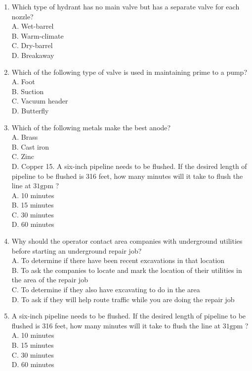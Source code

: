 \documentclass[10pt]{article}
\begin{document}
\begin{enumerate}
  \item Which type of hydrant has no main valve but has a separate valve for each nozzle?\\
A. Wet-barrel\\
B. Warm-climate\\
C. Dry-barrel\\
D. Breakaway

  \item Which of the following type of valve is used in maintaining prime to a pump?\\
A. Foot\\
B. Suction\\
C. Vacuum header\\
D. Butterfly

  \item Which of the following metals make the best anode?\\
A. Brass\\
B. Cast iron\\
C. Zinc\\
D. Copper 15. A six-inch pipeline needs to be flushed. If the desired length of pipeline to be flushed is 316 feet, how many minutes will it take to flush the line at $31 \mathrm{gpm}$ ?\\
A. 10 minutes\\
B. 15 minutes\\
C. 30 minutes\\
D. 60 minutes

  \item Why should the operator contact area companies with underground utilities before starting an underground repair job?\\
A. To determine if there have been recent excavations in that location\\
B. To ask the companies to locate and mark the location of their utilities in the area of the repair job\\
C. To determine if they also have excavating to do in the area\\
D. To ask if they will help route traffic while you are doing the repair job

  \item A six-inch pipeline needs to be flushed. If the desired length of pipeline to be flushed is 316 feet, how many minutes will it take to flush the line at $31 \mathrm{gpm}$ ?\\
A. 10 minutes\\
B. 15 minutes\\
C. 30 minutes\\
D. 60 minutes


\end{enumerate}
\end{document}
